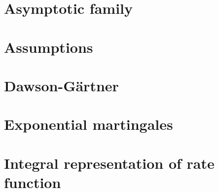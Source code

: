 

\section{Asymptotic family}


\section{Assumptions}


\section{Dawson-G\"artner}


\section{Exponential martingales}


\section{Integral representation of rate function}

